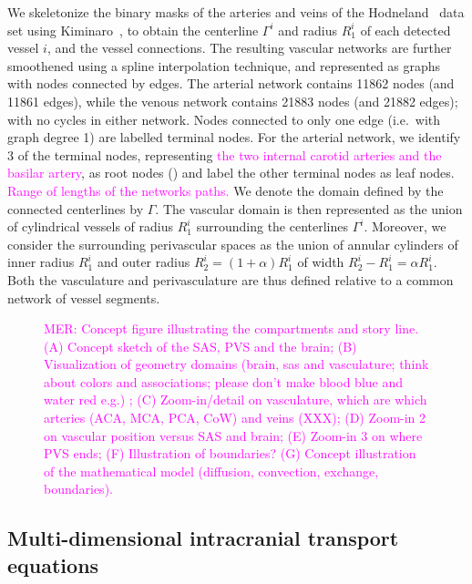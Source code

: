 \documentclass[fleqn,10pt]{wlscirep}
\newcommand{\mer}[1]{\textcolor{magenta}{#1}}
\begin{document}
We skeletonize the binary masks of the arteries and veins of the
Hodneland~\cite{hodneland2019new} data set using
Kiminaro~\cite{william_silversmith_2021_5539913}, to obtain the
centerline $\Gamma^i$ and radius $R_1^i$ of each detected vessel $i$,
and the vessel connections. The resulting vascular networks are
further smoothened using a spline interpolation technique, and
represented as graphs with nodes connected by edges. The arterial
network contains 11862 nodes (and 11861 edges), while the venous
network contains 21883 nodes (and 21882 edges); with no cycles in
either network. Nodes connected to only one edge (i.e.~with graph
degree 1) are labelled terminal nodes. For the arterial network, we
identify 3 of the terminal nodes, representing \mer{the two internal
  carotid arteries and the basilar artery}, as root nodes
() and label the other terminal nodes as leaf
nodes. \mer{Range of lengths of the networks paths.} We denote the
domain defined by the connected centerlines by $\Gamma$. The vascular
domain is then represented as the union of cylindrical vessels of
radius $R_1^i$ surrounding the centerlines $\Gamma^i$. Moreover, we
consider the surrounding perivascular spaces as the union of annular
cylinders of inner radius $R_1^i$ and outer radius $R_2^i = (1 +
\alpha) R_1^i$ of width $R_2^i - R_1^i = \alpha R_1^i$. Both the
vasculature and perivasculature are thus defined relative to a common
network of vessel segments.

\begin{figure}
  \caption{\mer{MER: Concept figure illustrating the compartments and story line. (A) Concept sketch of the SAS, PVS and the brain; (B) Visualization of geometry domains (brain, sas and vasculature; think about colors and associations; please don't make blood blue and water red e.g.) ; (C) Zoom-in/detail on vasculature, which are which arteries (ACA, MCA, PCA, CoW)  and veins (XXX); (D) Zoom-in 2 on vascular position versus SAS and brain; (E) Zoom-in 3 on where PVS ends; (F) Illustration of boundaries? (G) Concept illustration of the mathematical model (diffusion, convection, exchange, boundaries).}}
\label{fig:concept}
\end{figure}

\subsection*{Multi-dimensional intracranial transport equations}
\end{document}

